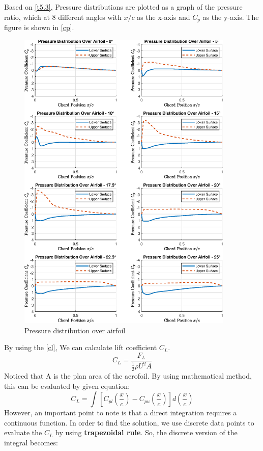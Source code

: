 Based on \autoref{t5.3}, Pressure distributions are plotted as a graph of the pressure ratio, which at 8 different angles with $x/c$ as the x-axis and $C_p$ as the y-axis. The figure is shown in \autoref{cp}.
\begin{figure}[htbp]
    \centering
    \includegraphics[width=0.92\textwidth]{output.eps}
    \caption{Pressure distribution over airfoil}
    \label{cp}
  \end{figure}
By using the \autoref{cl}, We can calculate lift coefficient $C_L$.
\begin{equation}
    \label{cl}
C_{L}={\frac{F_{L}}{{\frac{1}{2}}\rho U^{2}A}}
\end{equation}
Noticed that A is the plan area of the aerofoil. By using mathematical method, this can be evaluated by given equation:
$$
C_{L}=\int\left[C_{p l}\left(\frac{x}{c}\right)-C_{p u}\left(\frac{x}{c}\right)\right]d\left(\frac{x}{c}\right)
$$
However, an important point to note is that a direct integration requires a continuous function. In order to find the solution, we use discrete data points to evaluate the $C_L$ by using \textbf{trapezoidal rule}. So, the discrete version of the integral becomes:
